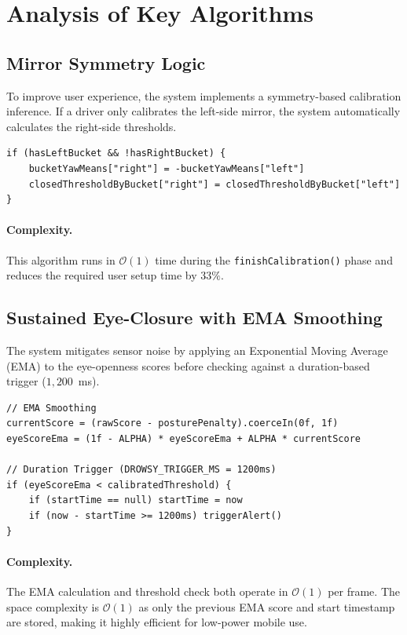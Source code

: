 \documentclass[11pt]{report}
\begin{document}
\section{Analysis of Key Algorithms}\label{sec:key-algorithms}

\subsection{Mirror Symmetry Logic}\label{subsec:mirror-algo}
To improve user experience, the system implements a symmetry-based calibration inference. If a driver only calibrates the left-side mirror, the system automatically calculates the right-side thresholds.

\begin{verbatim}
if (hasLeftBucket && !hasRightBucket) {
    bucketYawMeans["right"] = -bucketYawMeans["left"]
    closedThresholdByBucket["right"] = closedThresholdByBucket["left"]
}
\end{verbatim}

\paragraph{Complexity.}
This algorithm runs in $\mathcal{O}(1)$ time during the \texttt{finishCalibration()} phase and reduces the required user setup time by $33\%$.

\subsection{Sustained Eye-Closure with EMA Smoothing}\label{subsec:ema-algo}
The system mitigates sensor noise by applying an Exponential Moving Average (EMA) to the eye-openness scores before checking against a duration-based trigger ($1{,}200$~ms).

\begin{verbatim}
// EMA Smoothing
currentScore = (rawScore - posturePenalty).coerceIn(0f, 1f)
eyeScoreEma = (1f - ALPHA) * eyeScoreEma + ALPHA * currentScore

// Duration Trigger (DROWSY_TRIGGER_MS = 1200ms)
if (eyeScoreEma < calibratedThreshold) {
    if (startTime == null) startTime = now
    if (now - startTime >= 1200ms) triggerAlert()
}
\end{verbatim}

\paragraph{Complexity.}
The EMA calculation and threshold check both operate in $\mathcal{O}(1)$ per frame. The space complexity is $\mathcal{O}(1)$ as only the previous EMA score and start timestamp are stored, making it highly efficient for low-power mobile use.
\end{document}
